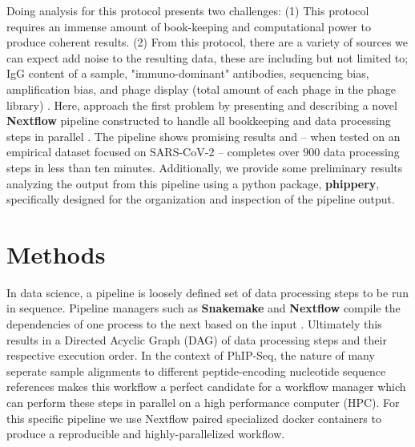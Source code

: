 \documentclass{article}
\begin{document}
Doing analysis for this protocol presents two challenges:
(1) This protocol requires an immense amount of book-keeping and computational power to produce coherent results.
(2) From this protocol, there are a variety of sources we can expect add noise to the resulting data, these are including but not limited to; 
IgG content of a sample, "immuno-dominant" antibodies, sequencing bias, amplification bias, and phage display (total amount of each phage in the phage library) \cite{Yuan2018}. 
Here, approach the first problem by presenting and describing a novel \textbf{Nextflow} pipeline constructed to handle all bookkeeping and data processing steps in parallel \cite{DiTommaso2017}.
The pipeline shows promising results and -- when tested on an empirical dataset focused on SARS-CoV-2 -- completes over $900$ data processing steps in less than ten minutes.
Additionally, we provide some preliminary results analyzing the output from this pipeline using a python package, \textbf{phippery}, specifically designed for the organization and inspection of the pipeline output.

\section*{Methods}

In data science, a pipeline is loosely defined set of data processing steps to be run in sequence. 
Pipeline managers such as \textbf{Snakemake} and \textbf{Nextflow} compile the dependencies of one process to the next based on the input \cite{Merkel_2017, Koster2012}.
Ultimately this results in a Directed Acyclic Graph (DAG) of data processing steps and their respective execution order. 
In the context of PhIP-Seq, the nature of many seperate sample alignments to different peptide-encoding nucleotide sequence references makes this workflow a perfect candidate for a workflow manager which can perform these steps in parallel on a high performance computer (HPC). 
For this specific pipeline we use Nextflow paired specialized docker containers to produce a reproducible and highly-parallelized workflow.
\end{document}

